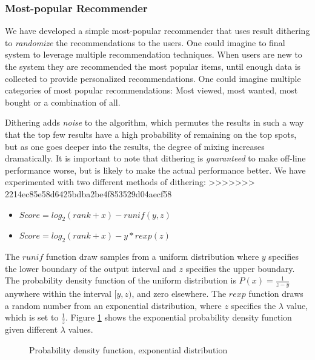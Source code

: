 \subsubsection{Most-popular Recommender}
We have developed a simple most-popular recommender that uses result dithering to \emph{randomize} the recommendations to the users. One could imagine to final system to leverage multiple recommendation techniques. When users are new to the system they are recommended the most popular items, until enough data is collected to provide personalized recommendations. One could imagine multiple categories of most popular recommendations: Most viewed, most wanted, most bought or a combination of all.

Dithering adds \emph{noise} to the algorithm, which permutes the results in such a way that the top few results have a high probability of remaining on the top spots, but as one goes deeper into the results, the degree of mixing increases dramatically. It is important to note that dithering is \emph{guaranteed} to make off-line performance worse, but is likely to make the actual performance better. We have experimented with two different methods of dithering:
>>>>>>> 2214ec85e58d6425bdba2be4f853529d04aecf58

\begin{itemize}
\item $Score = log_2(rank+x) - runif(y, z)$
\item $Score = log_2(rank+x) - y*rexp(z)$
\end{itemize}

The $runif$ function draw samples from a uniform distribution where $y$ specifies the lower boundary of the output interval and $z$ specifies the upper boundary. The probability density function of the uniform distribution is $P(x) = \frac{1}{z-y}$ anywhere within the interval $[y, z)$, and zero elsewhere. The $rexp$ function draws a random number from an exponential distribution, where $z$ specifies the $\lambda$ value, which is set to $\frac{1}{z}$. Figure \ref{fig:expdist} shows the exponential probability density function given different $\lambda$ values.

\begin{figure}[H]
\label{fig:expdist}
  \centering
    \caption{Probability density function, exponential distribution}
\end{figure}

